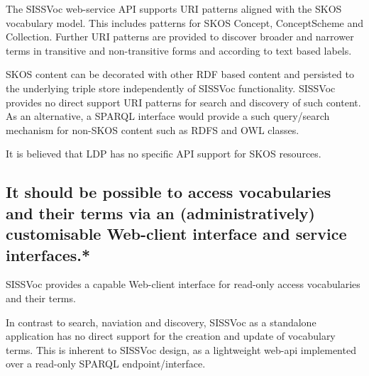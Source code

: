 \documentclass[10pt,a4paper]{article}
\begin{document}
\begin{flushleft}
  The SISSVoc web-service API supports URI patterns aligned with the SKOS
vocabulary model. This includes patterns for SKOS Concept,
ConceptScheme and Collection. Further URI patterns are provided to discover
broader and narrower terms in transitive and non-transitive forms and according
to text based labels. 

  SKOS content can be decorated with other RDF based
content and persisted to the underlying triple store independently of SISSVoc
functionality. SISSVoc provides
no direct support URI patterns for search and discovery of such content. As an
alternative, a SPARQL interface would provide a
such query/search mechanism for non-SKOS content such as RDFS and OWL classes. 

It is believed that LDP has no specific API support for SKOS resources.

% 
% 
% 

  \subsection{
  It should be possible to access vocabularies and their terms via an 
  (administratively) customisable Web-client interface and service interfaces.* } 


  SISSVoc provides a capable Web-client interface for read-only access vocabularies and their terms.

  In contrast to search, naviation and discovery, SISSVoc as a standalone application has no direct 
  support for the creation and update of vocabulary terms. This is inherent to SISSVoc design, as a 
  lightweight web-api implemented over a read-only SPARQL endpoint/interface.  


\end{flushleft}
\end{document}

